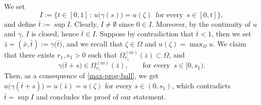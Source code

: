 \documentclass[11pt,a4paper]{article}
\numberwithin{equation}{section}
\def \z {{\zeta}}
\def \O {{\Omega}}
\begin{document}
{{We set
\begin{equation}
	I:= \Big\{t\in[0,1] \,:\, u\big(\gamma(s)\big)=u(\z) \,\text{ for every }\, s \in [0,t] \Big\},
\end{equation}
and define $\bar t:=\sup I$. Clearly, $I\neq \emptyset$ since $0\in I$. Moreover, by the continuity of $u$ and $\gamma$, $I$ is closed, hence $\bar t\in I$. Suppose by contradiction that $\bar t < 1$, then we set $\bar z=(\bar x,\bar t):=\gamma\big(\bar t\big)$, and we recall that $\z\in\O$ and $u(\z)=\max_\O u$. We claim that there exists $r_1,s_1>0$ such that $\O^{(m)}_{r_1}(\bar z)\subset\O$, and
\begin{equation}\label{gammain}
	\gamma \big(\bar t + s\big)\in \O^{(m)}_{r_1}(\bar z), \qquad \text{for every }\,s\in[0,s_1).
\end{equation}
Then, as a consequence of \eqref{max-prog-ball}, we get $u\big(\gamma (\bar t + s)\big)= u(\bar z)=u(\z)$ for every $s\in(0,s_1)$, which contradicts $\bar t=\sup I$ and concludes the proof of our statement.

}}
\end{document}
